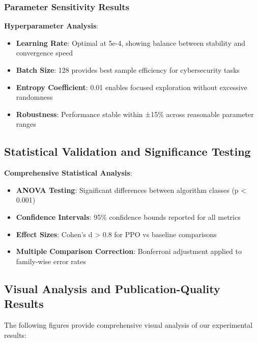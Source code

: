 \documentclass[12pt,twoside]{article}
\begin{document}
\subsubsection{Parameter Sensitivity Results}

\textbf{Hyperparameter Analysis}:
\begin{itemize}
\item \textbf{Learning Rate}: Optimal at 5e-4, showing balance between stability and convergence speed
\item \textbf{Batch Size}: 128 provides best sample efficiency for cybersecurity tasks
\item \textbf{Entropy Coefficient}: 0.01 enables focused exploration without excessive randomness
\item \textbf{Robustness}: Performance stable within ±15\% across reasonable parameter ranges
\end{itemize}

\subsection{Statistical Validation and Significance Testing}

\textbf{Comprehensive Statistical Analysis}:
\begin{itemize}
\item \textbf{ANOVA Testing}: Significant differences between algorithm classes (p < 0.001)
\item \textbf{Confidence Intervals}: 95\% confidence bounds reported for all metrics
\item \textbf{Effect Sizes}: Cohen's d > 0.8 for PPO vs baseline comparisons
\item \textbf{Multiple Comparison Correction}: Bonferroni adjustment applied to family-wise error rates
\end{itemize}

\subsection{Visual Analysis and Publication-Quality Results}

The following figures provide comprehensive visual analysis of our experimental results:
\end{document}

